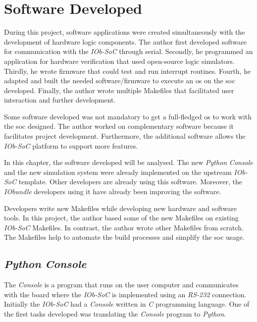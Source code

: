 \chapter{Software Developed}
\label{chapter:software_developed}
During this project, software applications were created simultaneously with the development of hardware logic components. The author first developed software for communication with the \textit{IOb-SoC} through serial. Secondly, he programmed an application for hardware verification that used open-source logic simulators. Thirdly, he wrote firmware that could test and run interrupt routines. Fourth, he adapted and built the needed software/firmware to execute an \acrlong{os} on the \acrshort{soc} developed. Finally, the author wrote multiple Makefiles that facilitated user interaction and further development.

Some software developed was not mandatory to get a full-fledged \acrlong{os} to work with the \acrlong{soc} designed. The author worked on complementary software because it facilitates project development. Furthermore, the additional software allows the \textit{IOb-SoC} platform to support more features.

In this chapter, the software developed will be analysed. The new \textit{Python} \textit{Console} and the new simulation system were already implemented on the upstream \textit{IOb-SoC} template. Other developers are already using this software. Moreover, the \textit{IObundle} developers using it have already been improving the software.

Developers write new Makefiles while developing new hardware and software tools. In this project, the author based some of the new Makefiles on existing \textit{IOb-SoC} Makefiles. In contrast, the author wrote other Makefiles from scratch. The Makefiles help to automate the build processes and simplify the \acrshort{soc} usage.

\section{\textit{Python} \textit{Console}}
\label{section:pyhton_console}
The \textit{Console} is a program that runs on the user computer and communicates with the board where the \textit{IOb-SoC} is implemented using an \textit{RS-232} connection. Initially the \textit{IOb-SoC} had a \textit{Console} written in \textit{C} programming language. One of the first tasks developed was translating the \textit{Console} program to \textit{Python}.


